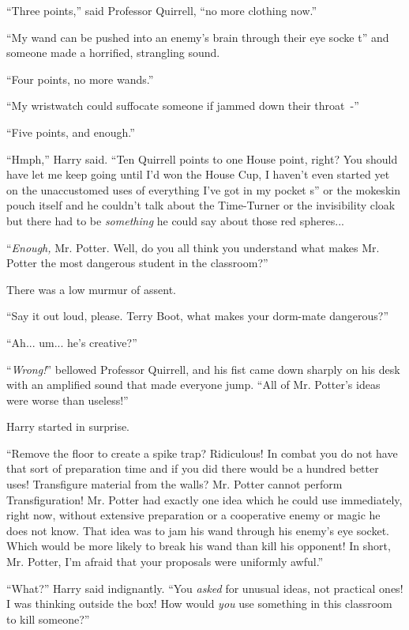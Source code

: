 ``Three points,'' said Professor Quirrell, ``no more clothing now.''

``My wand can be pushed into an enemy's brain through their eye socke t'' and someone made a horrified, strangling sound.

``Four points, no more wands.''

``My wristwatch could suffocate someone if jammed down their throat~-''

``Five points, and enough.''

``Hmph,'' Harry said. ``Ten Quirrell points to one House point, right? You should have let me keep going until I'd won the House Cup, I haven't even started yet on the unaccustomed uses of everything I've got in my pocket s'' or the mokeskin pouch itself and he couldn't talk about the Time-Turner or the invisibility cloak but there had to be \emph{something} he could say about those red spheres...

``\emph{Enough,} Mr. Potter. Well, do you all think you understand what makes Mr. Potter the most dangerous student in the classroom?''

There was a low murmur of assent.

``Say it out loud, please. Terry Boot, what makes your dorm-mate dangerous?''

``Ah... um... he's creative?''

``\emph{Wrong!}'' bellowed Professor Quirrell, and his fist came down sharply on his desk with an amplified sound that made everyone jump. ``All of Mr. Potter's ideas were worse than useless!''

Harry started in surprise.

``Remove the floor to create a spike trap? Ridiculous! In combat you do not have that sort of preparation time and if you did there would be a hundred better uses! Transfigure material from the walls? Mr. Potter cannot perform Transfiguration! Mr. Potter had exactly one idea which he could use immediately, right now, without extensive preparation or a cooperative enemy or magic he does not know. That idea was to jam his wand through his enemy's eye socket. Which would be more likely to break his wand than kill his opponent! In short, Mr. Potter, I'm afraid that your proposals were uniformly awful.''

``What?'' Harry said indignantly. ``You \emph{asked} for unusual ideas, not practical ones! I was thinking outside the box! How would \emph{you} use something in this classroom to kill someone?''

